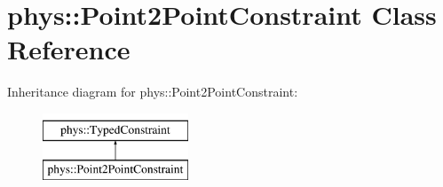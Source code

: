 \hypertarget{classphys_1_1Point2PointConstraint}{
\section{phys::Point2PointConstraint Class Reference}
\label{da/dfb/classphys_1_1Point2PointConstraint}
}
Inheritance diagram for phys::Point2PointConstraint:\begin{figure}[H]
\begin{center}
\leavevmode
\includegraphics[height=2cm]{da/dfb/classphys_1_1Point2PointConstraint}
\end{center}
\end{figure}
